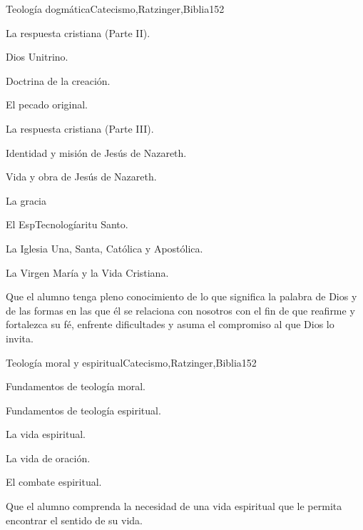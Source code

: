 \begin{syllabus}
\begin{unit}{Teología dogmática}{Catecismo,Ratzinger,Biblia}{15}{2}
\begin{topics}
	\item La respuesta cristiana (Parte II). 
	      \begin{inparaenum}
		  \item Dios Unitrino.
		  \item Doctrina de la creación.
		  \item El pecado original.
	      \end{inparaenum}
	 \item La respuesta cristiana (Parte III). 
	      \begin{inparaenum}
		  \item Identidad y misión de Jesús de Nazareth.
		  \item Vida y obra de Jesús de Nazareth.
		  \item La gracia
		  \item El EspTecnologíaritu Santo.
		  \item La Iglesia Una, Santa, Católica y Apostólica.
		  \item La Virgen María y la Vida Cristiana.
	      \end{inparaenum}
\end{topics}
\begin{learningoutcomes}
	\item Que el alumno tenga pleno conocimiento de lo que significa la palabra de Dios y de las formas en las que él se relaciona con nosotros con el fin de que reafirme y fortalezca su fé, enfrente dificultades y asuma el compromiso al que Dios lo invita.
\end{learningoutcomes}
\end{unit}

\begin{unit}{Teología moral y espiritual}{Catecismo,Ratzinger,Biblia}{15}{2}
\begin{topics}
      \item Fundamentos de teología moral.
      \item Fundamentos de teología espiritual.
      \item La vida espiritual.
      \item La vida de oración.
      \item El combate espiritual.
\end{topics}

\begin{learningoutcomes}
      \item Que el alumno comprenda la necesidad de una vida espiritual que le permita encontrar el sentido de su vida.
\end{learningoutcomes}
\end{unit}



\begin{coursebibliography}
\end{coursebibliography}

\end{syllabus}

